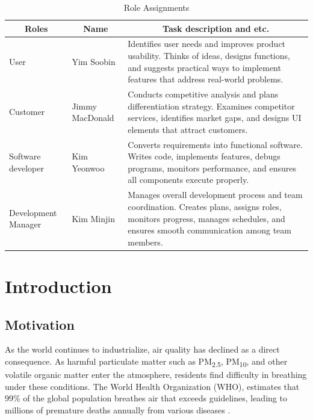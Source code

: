 \documentclass[conference]{IEEEtran}
\begin{document}
\begin{table}[htbp]
\caption{Role Assignments}
\begin{center}
\small
\setlength{\tabcolsep}{6pt} 
\renewcommand{\arraystretch}{1.3} 
\begin{tabular}{|p{2cm}|p{1.5cm}|p{4cm}|}
\hline
\multicolumn{1}{|c|}{\textbf{Roles}} & \multicolumn{1}{c|}{\textbf{Name}} & \multicolumn{1}{c|}{\textbf{Task description and etc.}} \\ \hline
\centering User & \centering Yim Soobin & Identifies user needs and improves product usability. Thinks of ideas, designs functions, and suggests practical ways to implement features that address real-world problems. \\ \hline
\centering Customer & \centering Jimmy MacDonald & Conducts competitive analysis and plans differentiation strategy. Examines competitor services, identifies market gaps, and designs UI elements that attract customers. \\ \hline
\centering Software developer & \centering Kim Yeonwoo & Converts requirements into functional software. Writes code, implements features, debugs programs, monitors performance, and ensures all components execute properly. \\ \hline
\centering Development Manager & \centering Kim Minjin & Manages overall development process and team coordination. Creates plans, assigns roles, monitors progress, manages schedules, and ensures smooth communication among team members. \\ \hline
\end{tabular}%
\label{tab1}
\end{center}
\end{table}

\newpage

\section{Introduction}
    \subsection{Motivation}
        As the world continues to industrialize, air quality has declined as a direct consequence. As harmful particulate matter such as PM\textsubscript{2.5}, PM\textsubscript{10}, and other volatile organic matter enter the atmosphere, residents find difficulty in breathing under these conditions. The World Health Organization (WHO), estimates that 99\% of the global population breathes air that exceeds guidelines, leading to millions of premature deaths annually from various diseases \cite{b1}. 
\end{document}
